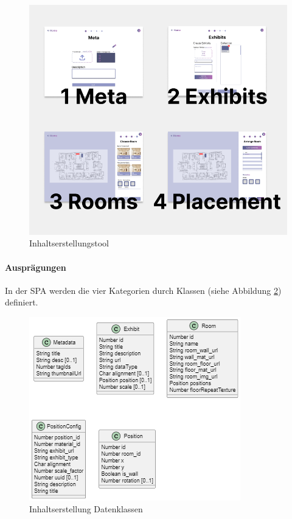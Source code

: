 \begin{figure}
    \centering
    \includegraphics[scale=0.5]{pics/CreateCreation4Categories.png}
    \caption{Inhaltserstellungstool}
    \label{fig:impl:creation:fourCategoires}
\end{figure}

\paragraph{Ausprägungen}
In der SPA werden die vier Kategorien durch Klassen (siehe Abbildung \ref{fig:impl:creation:dataclasses}) definiert. 

\begin{figure}
    \centering
    \includegraphics[scale=0.9]{pics/content_creation_classes.png}
    \caption{Inhaltserstellung Datenklassen}
    \label{fig:impl:creation:dataclasses}
\end{figure}

